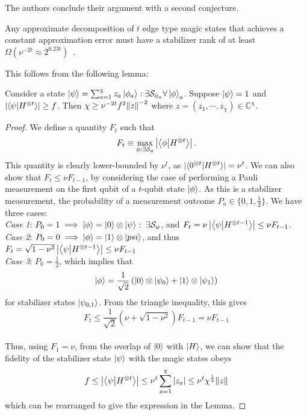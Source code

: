 \documentclass{standalone}
\begin{document}
\par
The authors conclude their argument with a second conjecture.
\begin{conj}\label{thm:minscaling}
Any approximate decomposition of $t$ edge type magic states that achieves a constant approximation error must have a stabilizer rank of at least $\Omega\left(\nu^{-2t}\approx2^{0.23t}\right)$~\cite{Bravyi2016b}.
\end{conj}
This follows from the following lemma:
\begin{lem}\label{thm:scalinglemma}
Consider a state $\ket{\psi}=\sum_{a=1}^{\chi}z_{a}\ket{\phi_{a}}:\exists \mathcal{S}_{\phi_{a}}\forall\ket{\phi}_{a}$. Suppose $\ket{\psi}=1$ and $\left|\braket{\psi}{H^{\otimes t}}\right|\geq f$. Then $\chi\geq\nu^{-2t}f^{2}\norm{z}^{-2}$ where $z=(z_{1},\cdots,z_{\chi})\in\mathbb{C}^{\chi}$.
\end{lem}
\begin{proof}
We define a quantity $F_{t}$ such that
\[F_{t}\equiv\max_{\phi:\exists\mathcal{S}_{\phi}}\left|\braket{\phi}{H^{\otimes t}}\right|.\]
This quantity is clearly lower-bounded by $\nu^{t}$, as $\left|\braket{0^{\otimes t}}{H^{\otimes t}}\right|=\nu^{t}$. We can also show that $F_{t}\leq\nu F_{t-1}$, by considering the case of performing a Pauli measurement on the first qubit of a $t$-qubit state $\ket{\phi}$. As this is a stabilizer measurement, the probability of a measurement outcome $P_{a}\in\{0,1,\frac{1}{2}\}$. We have three cases:\\
\emph{Case 1}: $P_{0}=1\implies\ket{\phi}=\ket{0}\otimes\ket{\psi}:\;\exists\mathcal{S}_{\psi}$, and $F_{t}=\nu\left|\braket{\psi}{H^{\otimes t-1}}\right|\leq\nu F_{t-1}$.\\
\emph{Case 2}: $P_{0}=0\implies\ket{\phi}=\ket{1}\otimes\ket{psi}$, and thus $F_{t}=\sqrt{1-\nu^{2}}\left|\braket{\psi}{H^{\otimes t-1}}\right|\leq\nu F_{t-1}$\\
\emph{Case 3}: $P_{0}=\frac{1}{2}$, which implies that 
\[\ket{\phi}=\frac{1}{\sqrt{2}}\left(\ket{0}\otimes\ket{\psi_{0}}+\ket{1}\otimes\ket{\psi_{1}}\right)\]
for stabilizer states $\ket{\psi_{0,1}}$. From the triangle inequality, this gives
\[F_{t}\leq\frac{1}{\sqrt{2}}\left(\nu+\sqrt{1-\nu^{2}}\right)F_{t-1}=\nu F_{t-1}\]\\
Thus, using $F_{1}=\nu$, from the overlap of $\ket{0}$ with $\ket{H}$, we can show that the fidelity of the stabilizer state $\ket{\psi}$ with the magic states obeys
\[f\leq\left|\braket{\psi}{H^{\otimes t}}\right|\leq\nu^{t}\sum_{a=1}^{\chi}\vert z_{a}\vert\leq\nu^{t}\chi^{\frac{1}{2}}\norm{z}\]
which can be rearranged to give the expression in the Lemma.
\end{proof}
\end{document}
